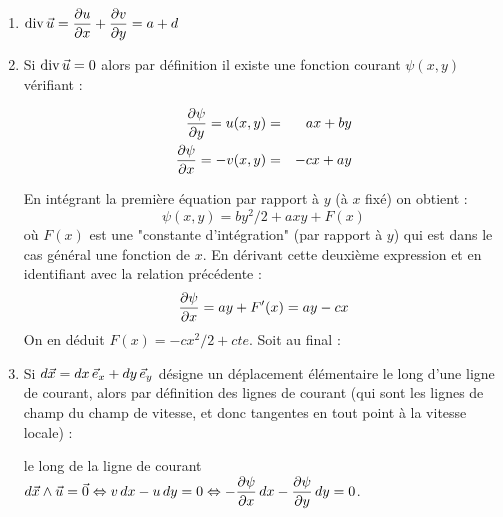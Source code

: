\documentclass[10pt, a4paper]{article}
\renewcommand{\myvec}[1]{\vec{#1}}
\begin{document}
\begin{enumerate}
\item
$\divergence \myvec{u} 
= \dpdx{u} + \dpdy{v} 
= a + d 
$

\item
%
%
%
%
%

Si $\divergence \myvec{u} =0$ alors par définition il existe une fonction courant $\psi(x,y)$ vérifiant :
 
 \begin{eqnarray}
\displaystyle \frac{\partial \psi}{\partial y} = u(x,y) &=& a x + by\\
\displaystyle \frac{\partial \psi}{\partial x} = - v(x,y) &=& -cx+ay
\end{eqnarray} 

En intégrant la première équation par rapport à $y$ (à $x$ fixé) on obtient :
$$
\psi(x,y) = b y^2/2 + a xy + F(x)
$$
où $F(x)$ est une "constante d'intégration" (par rapport à $y$) qui est dans le cas général une fonction de $x$.
En dérivant cette deuxième expression et en identifiant avec la relation précédente :
$$
\displaystyle \frac{\partial \psi}{\partial x} = a y + F'(x) = ay -c x
$$
On en déduit $F(x) = -c x^2/2 + cte$. Soit au final :




\medskip
\item
Si $d\myvec{x} = dx\, \ex + dy\,\ey$ désigne un déplacement élémentaire le long d'une ligne de courant,
alors par définition des lignes de courant (qui sont les lignes de champ du champ de vitesse, et 
donc tangentes en tout point à la vitesse locale) :

\medskip
le long de la ligne de courant $d\myvec{x} \wedge \myvec{u} = \myvec{0}
\Leftrightarrow v \, dx - u \, dy = 0
\Leftrightarrow -\dpdx{\psi} \, dx - \dpdy{\psi} \, dy = 0$.


\end{enumerate}
\end{document}
